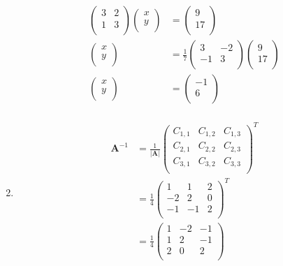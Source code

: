 \documentclass[10pt,oneside,a4paper]{article}
\begin{document}
\begin{enumerate}
\[
\begin{split}
\begin{pmatrix} 3 & 2 \\ 1 & 3 \\ \end{pmatrix} \begin{pmatrix} x \\ y \\ \end{pmatrix} &= \begin{pmatrix} 9 \\ 17 \\ \end{pmatrix} \\
\begin{pmatrix} x \\ y \\ \end{pmatrix} &= \frac{1}{7}\begin{pmatrix} 3 & -2 \\ -1 & 3 \\ \end{pmatrix} \begin{pmatrix} 9 \\ 17 \\ \end{pmatrix} \\
\begin{pmatrix} x \\ y \\ \end{pmatrix} &= \begin{pmatrix} -1 \\ 6 \\ \end{pmatrix} \\
\end{split}
\]

\item 

\[
\begin{split}
\mathbf{A}^{-1}
&= 
\frac{1}{|\mathbf{A}|}
\begin{pmatrix}
C_{1, 1} & C_{1, 2} & C_{1, 3} \\
C_{2, 1} & C_{2, 2} & C_{2, 3} \\
C_{3, 1} & C_{3, 2} & C_{3, 3} \\
\end{pmatrix}^T \\
&= 
\frac{1}{4}
\begin{pmatrix}
1 & 1 & 2 \\ 
-2 & 2 & 0 \\
-1 & -1 & 2 \\
\end{pmatrix}^T \\
&= \frac{1}{4}
\begin{pmatrix}
1 & -2 & -1 \\ 
1 & 2 & -1 \\
2 & 0 & 2 \\
\end{pmatrix} \\
\end{split}
\]


\end{enumerate}
\end{document}

